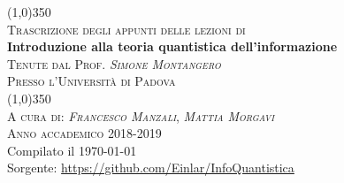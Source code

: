 \documentclass[12pt]{report} %
\makeatletter
\newcommand{\onlyinsubfile}[1]{#1}
\newcommand{\notinsubfile}[1]{}
\renewcommand{\@marginparreset}{%
  \reset@font\small
  \raggedright
  \slshape
  \@setminipage
}
\theoremstyle{plain}
\theoremstyle{definition}
\theoremstyle{remark}
\makeatother
\begin{document}
\renewcommand{\onlyinsubfile}[1]{}
\renewcommand{\notinsubfile}[1]{#1}

\setlength{\aboverulesep}{0pt}
\setlength{\belowrulesep}{0pt}
\setlength{\extrarowheight}{.75ex}
\begin{center}
                \line (1,0){350} \\
                \textsc{\normalsize Trascrizione degli appunti delle lezioni di}\\
                [0.25in]
                \huge{\bfseries Introduzione alla teoria quantistica dell'informazione}\\
                [2mm]
                \textsc{\normalsize Tenute dal Prof. \textit{Simone Montangero}}
                \vspace{-0.5em}\\
                \textsc{\normalsize Presso l'Università di Padova}\\
                \vspace{-1em}
                \line (1,0){350} \\
        [0.2cm]
        \textsc{\normalsize A cura di: \textit{Francesco Manzali}, \textit{Mattia Morgavi}}\\
                \textsc{\normalsize Anno accademico 2018-2019}\\ 
        {\scriptsize Compilato il \today}\\
        \vspace{-0.5em}
        {\scriptsize Sorgente: \url{https://github.com/Einlar/InfoQuantistica}}\\
        \vspace{-0.5em}
        {\scriptsize \doclicenseLongText}
\end{center}


\makeatletter
\renewcommand{\@marginparreset}{%
  \reset@font\small
  \raggedright
  \slshape
  \@setminipage
}
\makeatother

\tableofcontents 
\clearpage
\end{document}
